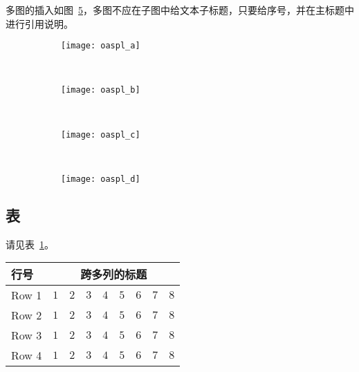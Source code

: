 {多图的插入如图~\ref{fig:oaspl}，多图不应在子图中给文本子标题，只要给序号，并在主标题中进行引用说明。
\begin{figure}[!htbp]
    \centering
    \begin{subfigure}[b]{0.35\textwidth}
      \texttt{[image: oaspl\_a]}
      \caption{}
      \label{fig:oaspl_a}
    \end{subfigure}%
    ~%
    \begin{subfigure}[b]{0.35\textwidth}
      \texttt{[image: oaspl\_b]}
      \caption{}
      \label{fig:oaspl_b}
    \end{subfigure}
    \\%
    \begin{subfigure}[b]{0.35\textwidth}
      \texttt{[image: oaspl\_c]}
      \caption{}
      \label{fig:oaspl_c}
    \end{subfigure}%
    ~%
    \begin{subfigure}[b]{0.35\textwidth}
      \texttt{[image: oaspl\_d]}
      \caption{}
      \label{fig:oaspl_d}
    \end{subfigure}
    \label{fig:oaspl}
\end{figure}

\subsection{表}

请见表~\ref{tab:sample}。
\begin{table}[!htbp]
    \label{tab:sample}
    \centering
    \footnotesize%
    \setlength{\tabcolsep}{4pt}%
    \renewcommand{\arraystretch}{1.2}%
    \begin{tabular}{lcccccccc}
        \hline
        行号 & \multicolumn{8}{c}{跨多列的标题}\\
        \hline
        Row 1 & $1$ & $2$ & $3$ & $4$ & $5$ & $6$ & $7$ & $8$\\
        Row 2 & $1$ & $2$ & $3$ & $4$ & $5$ & $6$ & $7$ & $8$\\
        Row 3 & $1$ & $2$ & $3$ & $4$ & $5$ & $6$ & $7$ & $8$\\
        Row 4 & $1$ & $2$ & $3$ & $4$ & $5$ & $6$ & $7$ & $8$\\
        \hline
    \end{tabular}
\end{table}

}
